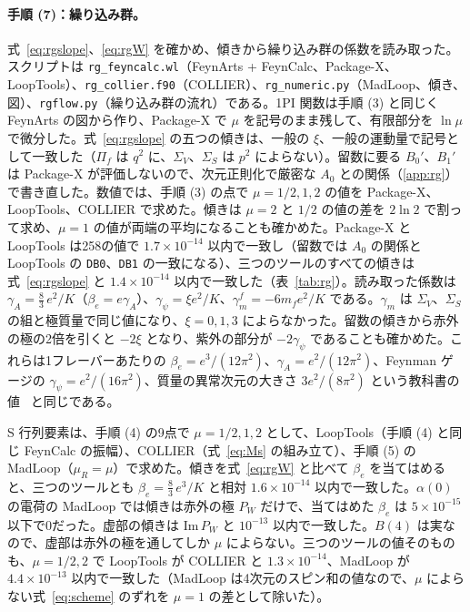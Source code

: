 \documentclass[a4paper,10pt]{ltjsarticle}
\begin{document}
\paragraph{手順 (7)：繰り込み群。}式~\eqref{eq:rgslope}、\eqref{eq:rgW} を確かめ、傾きから繰り込み群の係数を読み取った。スクリプトは \texttt{rg\_feyncalc.wl}（FeynArts + FeynCalc、Package-X、LoopTools）、\texttt{rg\_collier.f90}（COLLIER）、\texttt{rg\_numeric.py}（MadLoop、傾き、図）、\texttt{rgflow.py}（繰り込み群の流れ）である。1PI 関数は手順 (3) と同じく FeynArts の図から作り、Package-X で $\mu$ を記号のまま残して、有限部分を $\ln\mu$ で微分した。式~\eqref{eq:rgslope} の五つの傾きは、一般の $\xi$、一般の運動量で記号として一致した（$\Pi_f$ は $q^2$ に、$\Sigma_V$、$\Sigma_S$ は $p^2$ によらない）。留数に要る $B_0'$、$B_1'$ は Package-X が評価しないので、次元正則化で厳密な $A_0$ との関係（\ref{app:rg}）で書き直した。数値では、手順 (3) の点で $\mu=1/2,1,2$ の値を Package-X、LoopTools、COLLIER で求めた。傾きは $\mu=2$ と $1/2$ の値の差を $2\ln2$ で割って求め、$\mu=1$ の値が両端の平均になることも確かめた。Package-X と LoopTools は258の値で $1.7\times10^{-14}$ 以内で一致し（留数では $A_0$ の関係と LoopTools の \texttt{DB0}、\texttt{DB1} の一致になる）、三つのツールのすべての傾きは式~\eqref{eq:rgslope} と $1.4\times10^{-14}$ 以内で一致した（表~\ref{tab:rg}）。読み取った係数は $\gamma_A=\frac83\,e^2/K$（$\beta_e=e\gamma_A$）、$\gamma_\psi=\xi e^2/K$、$\gamma_m^f=-6m_fe^2/K$ である。$\gamma_m$ は $\Sigma_V$、$\Sigma_S$ の組と極質量で同じ値になり、$\xi=0,1,3$ によらなかった。留数の傾きから赤外の極の2倍を引くと $-2\xi$ となり、紫外の部分が $-2\gamma_\psi$ であることも確かめた。これらは1フレーバーあたりの $\beta_e=e^3/(12\pi^2)$、$\gamma_A=e^2/(12\pi^2)$、Feynman ゲージの $\gamma_\psi=e^2/(16\pi^2)$、質量の異常次元の大きさ $3e^2/(8\pi^2)$ という教科書の値~\cite{peskin} と同じである。

S 行列要素は、手順 (4) の9点で $\mu=1/2,1,2$ として、LoopTools（手順 (4) と同じ FeynCalc の振幅）、COLLIER（式~\eqref{eq:Ms} の組み立て）、手順 (5) の MadLoop（$\mu_R=\mu$）で求めた。傾きを式~\eqref{eq:rgW} と比べて $\beta_e$ を当てはめると、三つのツールとも $\beta_e=\frac83\,e^3/K$ と相対 $1.6\times10^{-14}$ 以内で一致した。$\alpha(0)$ の電荷の MadLoop では傾きは赤外の極 $P_W$ だけで、当てはめた $\beta_e$ は $5\times10^{-15}$ 以下で0だった。虚部の傾きは $\mathrm{Im}\,P_W$ と $10^{-13}$ 以内で一致した。$B(4)$ は実なので、虚部は赤外の極を通してしか $\mu$ によらない。三つのツールの値そのものも、$\mu=1/2,2$ で LoopTools が COLLIER と $1.3\times10^{-14}$、MadLoop が $4.4\times10^{-13}$ 以内で一致した（MadLoop は4次元のスピン和の値なので、$\mu$ によらない式~\eqref{eq:scheme} のずれを $\mu=1$ の差として除いた）。
\end{document}
